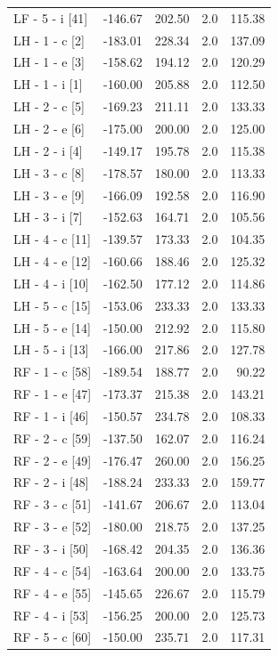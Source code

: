 \documentclass[a4paper,11pt]{article}
\begin{document}
\begin{small}
\begin{longtable}{p{4.5cm}rrrr}
LF - 5 - i [41] & -146.67 & 202.50 & 2.0 & 115.38 \\
LH - 1 - c [2] & -183.01 & 228.34 & 2.0 & 137.09 \\
LH - 1 - e [3] & -158.62 & 194.12 & 2.0 & 120.29 \\
LH - 1 - i [1] & -160.00 & 205.88 & 2.0 & 112.50 \\
LH - 2 - c [5] & -169.23 & 211.11 & 2.0 & 133.33 \\
LH - 2 - e [6] & -175.00 & 200.00 & 2.0 & 125.00 \\
LH - 2 - i [4] & -149.17 & 195.78 & 2.0 & 115.38 \\
LH - 3 - c [8] & -178.57 & 180.00 & 2.0 & 113.33 \\
LH - 3 - e [9] & -166.09 & 192.58 & 2.0 & 116.90 \\
LH - 3 - i [7] & -152.63 & 164.71 & 2.0 & 105.56 \\
LH - 4 - c [11] & -139.57 & 173.33 & 2.0 & 104.35 \\
LH - 4 - e [12] & -160.66 & 188.46 & 2.0 & 125.32 \\
LH - 4 - i [10] & -162.50 & 177.12 & 2.0 & 114.86 \\
LH - 5 - c [15] & -153.06 & 233.33 & 2.0 & 133.33 \\
LH - 5 - e [14] & -150.00 & 212.92 & 2.0 & 115.80 \\
LH - 5 - i [13] & -166.00 & 217.86 & 2.0 & 127.78 \\
RF - 1 - c [58] & -189.54 & 188.77 & 2.0 & 90.22 \\
RF - 1 - e [47] & -173.37 & 215.38 & 2.0 & 143.21 \\
RF - 1 - i [46] & -150.57 & 234.78 & 2.0 & 108.33 \\
RF - 2 - c [59] & -137.50 & 162.07 & 2.0 & 116.24 \\
RF - 2 - e [49] & -176.47 & 260.00 & 2.0 & 156.25 \\
RF - 2 - i [48] & -188.24 & 233.33 & 2.0 & 159.77 \\
RF - 3 - c [51] & -141.67 & 206.67 & 2.0 & 113.04 \\
RF - 3 - e [52] & -180.00 & 218.75 & 2.0 & 137.25 \\
RF - 3 - i [50] & -168.42 & 204.35 & 2.0 & 136.36 \\
RF - 4 - c [54] & -163.64 & 200.00 & 2.0 & 133.75 \\
RF - 4 - e [55] & -145.65 & 226.67 & 2.0 & 115.79 \\
RF - 4 - i [53] & -156.25 & 200.00 & 2.0 & 125.73 \\
RF - 5 - c [60] & -150.00 & 235.71 & 2.0 & 117.31 \\

\end{longtable}
\end{small}
\end{document}
